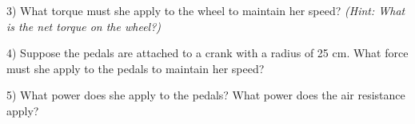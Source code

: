 \documentclass[12pt]{article}
\begin{document}
3) What torque must she apply to the wheel to maintain her speed? \textit{(Hint: What is the net torque on the wheel?)}
\vspace{2in}

\newpage

4) Suppose the pedals are attached to a crank with a radius of 25 cm. What force must she apply to the pedals to maintain her speed?
\vspace{3in}

5) What power does she apply to the pedals? What power does the air resistance apply?
\newpage
%
%
%
%
%
%
%
%
%
%
%
%
%
%
%
%
%
%
%
%
%
\end{document}
